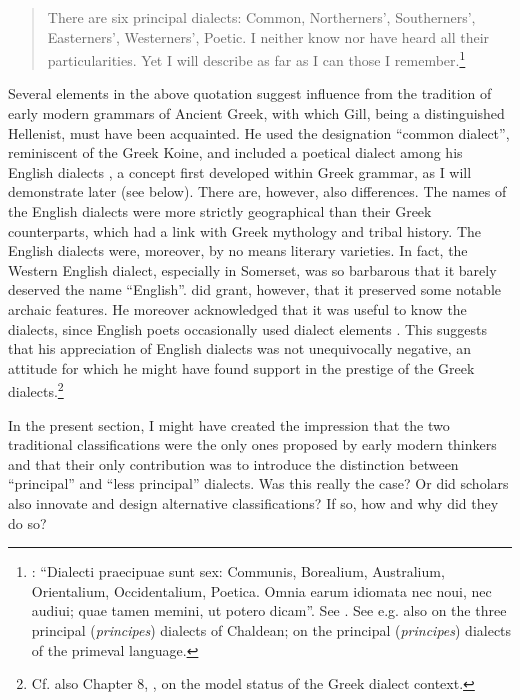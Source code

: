 {\begin{quote}
There are six principal dialects: Common, Northerners’, Southerners’, Easterners’, Westerners’, Poetic. I neither know nor have heard all their particularities. Yet I will describe as far as I can those I remember.\footnote{\citet[15]{Gill1619}: “Dialecti praecipuae sunt sex: Communis, Borealium, Australium, Orientalium, Occidentalium, Poetica. Omnia earum idiomata nec noui, nec audiui; quae tamen memini, ut potero dicam”. See \citet{Kokeritz1938}. See e.g. also \citet[liv]{Thomassin1697} on the three principal (\textit{principes}) dialects of Chaldean; \citet[\textsc{xciii}]{Schultens1748} on the principal (\textit{principes}) dialects of the primeval language.}
\end{quote}

Several elements in the above quotation suggest influence from the tradition of early modern grammars of Ancient Greek, with which Gill, being a distinguished Hellenist, must have been acquainted. He used the designation “common dialect”, reminiscent of the Greek Koine, and included a poetical dialect among his English dialects \citep[18]{Gill1619}, a concept first developed within Greek grammar, as I will demonstrate later (see  below). There are, however, also differences. The names of the English dialects were more strictly geographical than their Greek counterparts, which had a link with Greek mythology and tribal history. The English dialects were, moreover, by no means literary varieties. In fact, the Western English dialect, especially in Somerset, was so barbarous that it barely deserved the name “English”. \citet[17]{Gill1619} did grant, however, that it preserved some notable archaic features. He moreover acknowledged that it was useful to know the dialects, since English poets occasionally used dialect elements \citep[18]{Gill1619}. This suggests that his appreciation of English dialects was not unequivocally negative, an attitude for which he might have found support in the prestige of the Greek dialects.\footnote{Cf. also Chapter 8, , on the model status of the Greek dialect context.}

In the present section, I might have created the impression that the two traditional classifications were the only ones proposed by early modern thinkers and that their only contribution was to introduce the distinction between “principal” and “less principal” dialects. Was this really the case? Or did scholars also innovate and design alternative classifications? If so, how and why did they do so?

}
